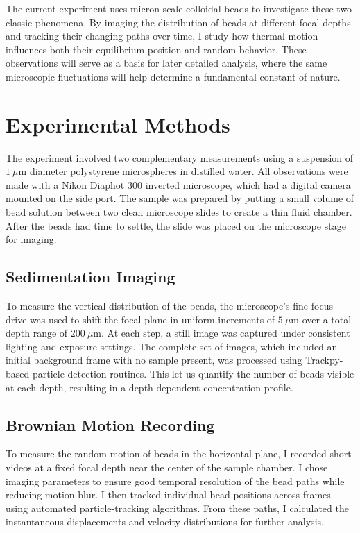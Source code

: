 \documentclass[%
 reprint,
 amsmath,amssymb,
 aps,
]{revtex4-2}
\begin{document}
The current experiment uses micron-scale colloidal beads to investigate these two classic phenomena. By imaging the distribution of beads at different focal depths and tracking their changing paths over time, I study how thermal motion influences both their equilibrium position and random behavior. These observations will serve as a basis for later detailed analysis, where the same microscopic fluctuations will help determine a fundamental constant of nature.


\section*{Experimental Methods}

The experiment involved two complementary measurements using a suspension of $1~\mu\text{m}$ diameter polystyrene microspheres in distilled water. All observations were made with a Nikon Diaphot 300 inverted microscope, which had a digital camera mounted on the side port. The sample was prepared by putting a small volume of bead solution between two clean microscope slides to create a thin fluid chamber. After the beads had time to settle, the slide was placed on the microscope stage for imaging.

\subsection*{Sedimentation Imaging}

To measure the vertical distribution of the beads, the microscope's fine-focus drive was used to shift the focal plane in uniform increments of $5~\mu\text{m}$ over a total depth range of $200~\mu\text{m}$. At each step, a still image was captured under consistent lighting and exposure settings. The complete set of images, which included an initial background frame with no sample present, was processed using Trackpy-based particle detection routines. \cite{trackpy} This let us quantify the number of beads visible at each depth, resulting in a depth-dependent concentration profile.

\subsection*{Brownian Motion Recording}

To measure the random motion of beads in the horizontal plane, I recorded short videos at a fixed focal depth near the center of the sample chamber. I chose imaging parameters to ensure good temporal resolution of the bead paths while reducing motion blur. I then tracked individual bead positions across frames using automated particle-tracking algorithms. From these paths, I calculated the instantaneous displacements and velocity distributions for further analysis.
\end{document}
